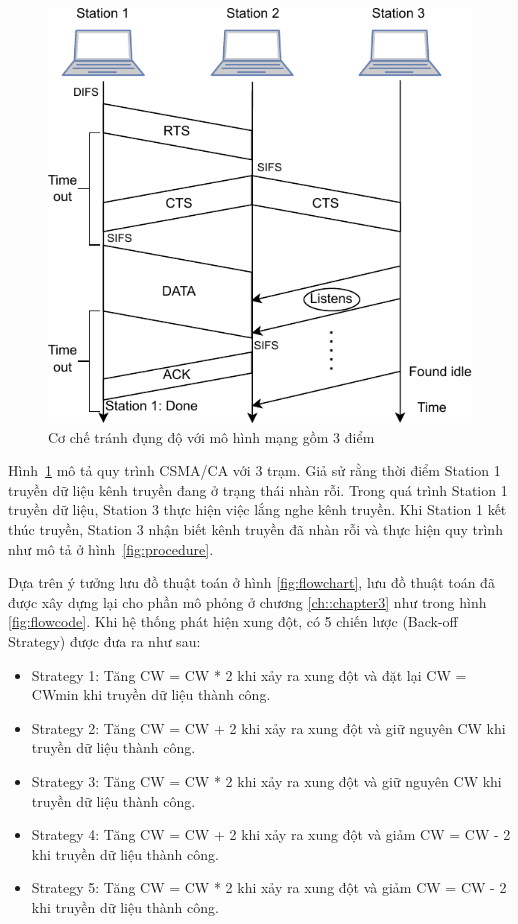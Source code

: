 \begin{figure}[h]
    \centering
    \includegraphics[width=0.7\linewidth]{figures/Chapter2/csma_ca scheme_k2opt.pdf}
    \caption{Cơ chế tránh đụng độ với mô hình mạng gồm 3 điểm}
    \label{fig:csmaca}
\end{figure}

Hình~\ref{fig:csmaca} mô tả quy trình CSMA/CA với 3 trạm. Giả sử rằng thời điểm Station 1 truyền dữ liệu kênh truyền đang ở trạng thái nhàn rỗi.
Trong quá trình Station 1 truyền dữ liệu, Station 3 thực hiện việc lắng nghe kênh truyền. Khi Station 1 kết thúc truyền, Station 3 nhận biết kênh truyền 
đã nhàn rỗi và thực hiện quy trình như mô tả ở hình~\ref{fig:procedure}.



Dựa trên ý tưởng lưu đồ thuật toán ở hình \ref{fig:flowchart}, lưu đồ thuật toán đã được xây dựng lại cho phần mô phỏng ở chương \ref{ch::chapter3} như trong hình \ref{fig:flowcode}. Khi hệ thống phát hiện
xung đột, có 5 chiến lược (Back-off Strategy) được đưa ra như sau:
\begin{itemize}
    \item Strategy 1: Tăng CW = CW * 2 khi xảy ra xung đột và đặt lại CW = CWmin khi truyền dữ liệu thành công.
    \item Strategy 2: Tăng CW = CW + 2 khi xảy ra xung đột và giữ nguyên CW khi truyền dữ liệu thành công.
    \item Strategy 3: Tăng CW = CW * 2 khi xảy ra xung đột và giữ nguyên CW khi truyền dữ liệu thành công.
    \item Strategy 4: Tăng CW = CW + 2 khi xảy ra xung đột và giảm CW = CW - 2 khi truyền dữ liệu thành công.
    \item Strategy 5: Tăng CW = CW * 2 khi xảy ra xung đột và giảm CW = CW - 2 khi truyền dữ liệu thành công.
\end{itemize}


